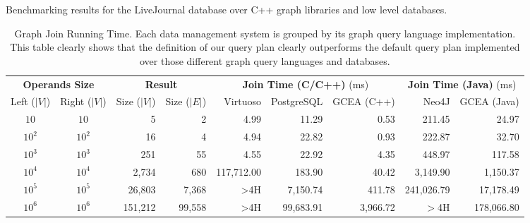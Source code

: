 \begin{table}[!t]
	\caption{Benchmarking results for the LiveJournal database over C++ graph libraries and low
		level databases.}
	\label{fig:datastruc}
\end{table}\begin{table}[!tbh]
	\centering
	\begin{adjustbox}{max width=\textwidth}
			{\centering
				\begin{tabular}{@{}cc|rr|rrr|rr@{}}
					\toprule
					\multicolumn{2}{c}{\textbf{Operands Size}} &
					\multicolumn{2}{c}{\textbf{Result}} & \multicolumn{3}{c}{\textbf{Join Time (C/C++)} (ms)}  & \multicolumn{2}{c}{\textbf{Join Time (Java)} (ms) } \\
					Left ($|V|$) & Right ($|V|$) & Size ($|V|$) & Size ($|E|$) & Virtuoso & PostgreSQL & GCEA (C++) &   Neo4J & GCEA (Java) \\
					\midrule
					$10$ & $10$ & 5 & 2 & 4.99 & 11.29 & 0.53 & 211.45 & 24.97\\
					$10^2$ & $10^2$ & 16 & 4 & 4.94 & 22.82 & 0.93 &  222.87 & 32.70\\
					$10^3$ & $10^3$ & 251 & 55 & 4.55 & 22.92 & 4.35 & 448.97 & 117.58\\
					$10^4$ & $10^4$ & 2,734 & 680 & 117,712.00& 183.90 & 40.42 &  3,149.90 & 1,150.37\\
					$10^5$ & $10^5$ & 26,803 & 7,368 & >4H & 7,150.74 & 411.78 &  241,026.79 & 17,178.49 \\
					$10^6$ & $10^6$ & 151,212 & 99,558 & >4H & 99,683.91 & 3,966.72 & $>$4H & 178,066.80\\
					\bottomrule
				\end{tabular}
			}
	\end{adjustbox}
	\caption{Graph Join Running Time. Each data management system is grouped by its graph query language implementation. This table clearly shows that the definition of our query plan clearly outperforms the default query plan implemented over those different graph query languages and databases.}\label{tab:evaluatejoin}
\end{table}
